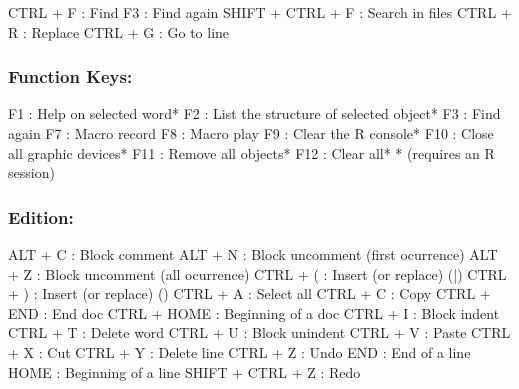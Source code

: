 \vspace{-0.5cm}
\begin{Rtables}[caption={[Search/Replace and go keyboard shortcuts]
    Search/Replace and go keyboard shortcuts},
  label=hotkey:search]
  CTRL  + F               : Find
  F3                      : Find again
  SHIFT + CTRL + F        : Search in files
  CTRL  + R               : Replace
  CTRL  + G               : Go to line
\end{Rtables}


\subsubsection{Function Keys:}

\vspace{-0.5cm}
\begin{Rtables}[caption={[Function keys]
    Function keys},
  label=hotkey:function]
  F1                      : Help on selected word*
  F2                      : List the structure of selected object*
  F3                      : Find again
  F7                      : Macro record
  F8                      : Macro play
  F9                      : Clear the R console*
  F10                     : Close all graphic devices*
  F11                     : Remove all objects*
  F12                     : Clear all*
  * (requires an R session)
\end{Rtables}


\subsubsection{Edition:}

\vspace{-0.5cm}
\begin{Rtables}[caption={[Edition keyboard shortcuts]
    Edition keyboard shortcuts},
  label=hotkey:editions]
  ALT   + C               : Block comment
  ALT   + N               : Block uncomment (first ocurrence)
  ALT   + Z               : Block uncomment (all ocurrence)
  CTRL  + (               : Insert (or replace) (|)
  CTRL  + )               : Insert (or replace) ()
  CTRL  + A               : Select all
  CTRL  + C               : Copy
  CTRL  + END             : End doc
  CTRL  + HOME            : Beginning of a doc
  CTRL  + I               : Block indent
  CTRL  + T               : Delete word
  CTRL  + U               : Block unindent
  CTRL  + V               : Paste
  CTRL  + X               : Cut
  CTRL  + Y               : Delete line
  CTRL  + Z               : Undo
  END                     : End of a line
  HOME                    : Beginning of a line
  SHIFT + CTRL + Z        : Redo
\end{Rtables}


